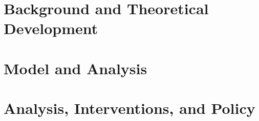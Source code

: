 

\part{Background and Theoretical Development} \label{part-background}





\part{Model and Analysis} \label{part-model}



\part{Analysis, Interventions, and Policy} \label{part-analysis}


